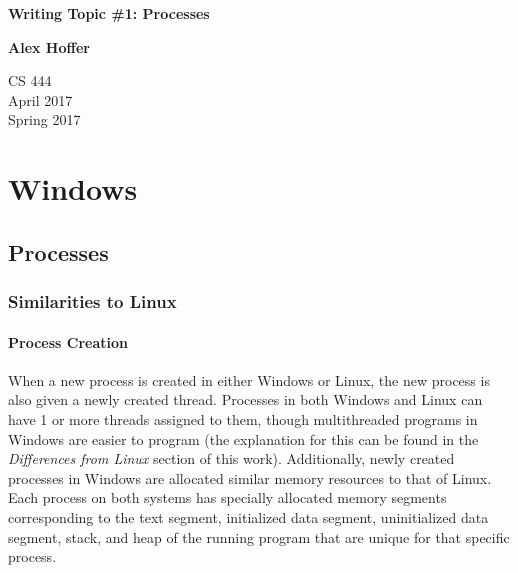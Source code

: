 \documentclass[letterpaper,10pt,titlepage]{article}
\begin{document}
\begin{titlepage}
    \begin{center}
        \vspace*{3.5cm}

        \textbf{Writing Topic \#1: Processes}

        \vspace{0.5cm}

        \textbf{Alex Hoffer}

        \vspace{0.8cm}

        CS 444\\
        April 2017\\
	Spring 2017\\

        \vfill

    \end{center}
\end{titlepage}

\newpage

\tableofcontents

\newpage



\section{Windows}
\cite{mck15} \cite{ker10} 

\subsection{Processes}

\subsubsection{Similarities to Linux}
\paragraph{Process Creation}
When a new process is created in either Windows or Linux, the new process is also given a newly created thread. Processes in both Windows and Linux can have 1 or more threads assigned to them, though multithreaded programs in Windows are easier to program (the explanation for this can be found in the \emph{Differences from Linux} section of this work). Additionally, newly created processes in Windows are allocated similar memory resources to that of Linux. Each process on both systems has specially allocated memory segments corresponding to the text segment, initialized data segment, uninitialized data segment, stack, and heap of the running program that are unique for that specific process.
\end{document}
